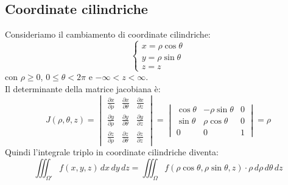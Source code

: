 \subsection{Coordinate cilindriche}
Consideriamo il cambiamento di coordinate cilindriche:
\[
\begin{cases}
  x = \rho \cos \theta \\
  y = \rho \sin \theta \\
  z = z
\end{cases}
\]
con $\rho \geq 0$, $0 \leq \theta < 2\pi$ e $-\infty < z < \infty$.\\
Il determinante della matrice jacobiana è:
\[
J(\rho, \theta, z) = \begin{vmatrix}
  \frac{\partial x}{\partial \rho} & \frac{\partial x}{\partial \theta} & \frac{\partial x}{\partial z} \\
  \frac{\partial y}{\partial \rho} & \frac{\partial y}{\partial \theta} & \frac{\partial y}{\partial z} \\
  \frac{\partial z}{\partial \rho} & \frac{\partial z}{\partial \theta} & \frac{\partial z}{\partial z}
\end{vmatrix} = \begin{vmatrix}
  \cos \theta & -\rho \sin \theta & 0 \\
  \sin \theta & \rho \cos \theta & 0 \\
  0 & 0 & 1
\end{vmatrix} = \rho
\]
Quindi l'integrale triplo in coordinate cilindriche diventa:
\[
\iiint_{\Omega'} f(x,y,z) \, dx \, dy \, dz = \iiint_{\Omega} f(\rho \cos \theta, \rho \sin \theta, z) \cdot \rho \, d\rho \, d\theta \, dz
\]

